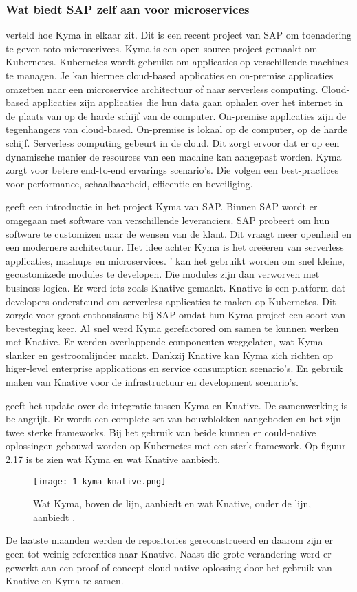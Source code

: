 \subsubsection{Wat biedt SAP zelf aan voor microservices}
\textcite{Kyma2019} verteld hoe Kyma in elkaar zit. Dit is een recent project van SAP om toenadering te geven toto microserivces. Kyma is een open-source project gemaakt om Kubernetes. Kubernetes wordt gebruikt om applicaties op verschillende machines te managen. Je kan hiermee cloud-based applicaties en on-premise applicaties omzetten naar een microservice architectuur of naar serverless computing. Cloud-based applicaties zijn applicaties die hun data gaan ophalen over het internet in de plaats van op de harde schijf van de computer. On-premise applicaties zijn de tegenhangers van cloud-based. On-premise is lokaal op de computer, op de harde schijf. Serverless computing gebeurt in de cloud. Dit zorgt ervoor dat er op een dynamische manier de resources van een machine kan aangepast worden. 
Kyma zorgt voor betere end-to-end ervarings scenario's. Die volgen een best-practices voor performance, schaalbaarheid, efficentie en beveiliging. 

\textcite{Semerdzhiev2018} geeft een introductie in het project Kyma van SAP. Binnen SAP wordt er omgegaan met software van verschillende leveranciers. SAP probeert om hun software te customizen naar de  wensen van de klant. Dit vraagt meer openheid en een modernere architectuur. 
Het idee achter Kyma is het creëeren van serverless applicaties, mashups en microservices. ' kan het gebruikt worden om snel kleine, gecustomizede modules te developen. Die modules zijn dan verworven met business logica. 
Er  werd iets zoals Knative gemaakt. Knative is een platform dat developers ondersteund om serverless applicaties te maken op Kubernetes. Dit zorgde voor groot enthousiasme bij SAP omdat hun Kyma project een soort van bevesteging keer. Al snel  werd Kyma gerefactored om samen te kunnen  werken met Knative. Er  werden overlappende componenten  weggelaten, wat Kyma slanker en gestroomlijnder maakt. Dankzij Knative kan Kyma zich richten op higer-level enterprise applications en service consumption scenario's. En gebruik maken van Knative voor de infrastructuur en development scenario's. 

\textcite{Hofmann2018} geeft het update over de integratie tussen Kyma en Knative. De samenwerking is belangrijk. Er wordt een complete set van bouwblokken aangeboden en het zijn twee sterke frameworks. Bij het gebruik van beide kunnen er could-native oplossingen gebouwd worden op Kubernetes met een sterk framework. Op figuur 2.17 is te zien wat Kyma en wat Knative aanbiedt. 
\begin{figure}[h]
	\texttt{[image: 1-kyma-knative.png]}
	\caption{Wat Kyma, boven de lijn, aanbiedt en wat Knative, onder de lijn, aanbiedt \textcite{Hofmann2018}.}
	\centering
\end{figure}
De laatste maanden  werden de repositories gereconstrueerd en daarom zijn er geen tot  weinig referenties naar Knative. Naast die grote verandering  werd er gewerkt aan een proof-of-concept cloud-native oplossing door het gebruik van Knative en Kyma te samen. 

